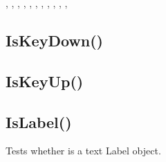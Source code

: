 \documentclass[letterpaper,10pt,english]{sphinxmanual}
\begin{document}
\sphinxAtStartPar
{}

\sphinxAtStartPar
{}, ,   , , ,   , , ,   , , ,   

\ignorespaces 

\subsection{IsKeyDown()}
\label{\detokenize{reference/peblenvironment:iskeydown}}\label{\detokenize{reference/peblenvironment:index-41}}
\sphinxAtStartPar
{}

\sphinxAtStartPar
{}

\sphinxAtStartPar
{}

\ignorespaces 

\subsection{IsKeyUp()}
\label{\detokenize{reference/peblenvironment:iskeyup}}\label{\detokenize{reference/peblenvironment:index-42}}
\sphinxAtStartPar
{}

\sphinxAtStartPar
{}

\sphinxAtStartPar
{}

\ignorespaces 

\subsection{IsLabel()}
\label{\detokenize{reference/peblenvironment:islabel}}\label{\detokenize{reference/peblenvironment:index-43}}
\sphinxAtStartPar
{}

\sphinxAtStartPar
Tests whether  is a text Label object.
\end{document}
